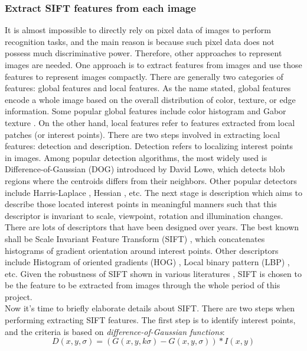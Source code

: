 \subsubsection{Extract SIFT features from each image}
It is almost impossible to directly rely on pixel data of images to perform recognition tasks, and the main reason is because such pixel data does not possess much discriminative power. Therefore, other approaches to represent images are needed. One approach is to extract features from images and use those features to represent images compactly. There are generally two categories of features: global features and local features. As the name stated, global features encode a whole image based on the overall distribution of color, texture, or edge information. Some popular global features include color histogram and Gabor texture \cite{manjunath1996texture}. On the other hand, local features refer to features extracted from local patches (or interest points). There are two steps involved in extracting local features: detection and description. Detection refers to localizing interest points in images. Among popular detection algorithms, the most widely used is Difference-of-Gaussian (DOG) \cite{lowe2004distinctive} introduced by David Lowe, which detects blob regions where the centroids differs from their neighbors. Other popular detectors include Harris-Laplace \cite{lindeberg1998feature}, Hessian \cite{mikolajczyk2004scale}, etc. The next stage is description which aims to describe those located interest points in meaningful manners such that this descriptor is invariant to scale, viewpoint, rotation and illumination changes. There are lots of descriptors that have been designed over years. The best known shall be Scale Invariant Feature Transform (SIFT) \cite{lowe2004distinctive}, which concatenates histograms of gradient orientation around interest points. Other descriptors include Histogram of oriented gradients (HOG) \cite{dalal2005histograms}, Local binary pattern (LBP) \cite{ojala2002multiresolution}, etc. Given the robustness of SIFT shown in various literatures \cite{duan2012visual,zhou2008sift,lazebnik2006beyond, lowe2004distinctive}, SIFT is chosen to be the feature to be extracted from images through the whole period of this project.\\

\noindent Now it's time to briefly elaborate details about SIFT. There are two steps when performing extracting SIFT features. The first step is to identify interest points, and the criteria is based on {\em difference-of-Gaussian functions}:
\begin{equation}
D(x, y, \sigma) = (G(x, y, k\sigma) - G(x, y, \sigma)) * I(x, y)
\end{equation}


